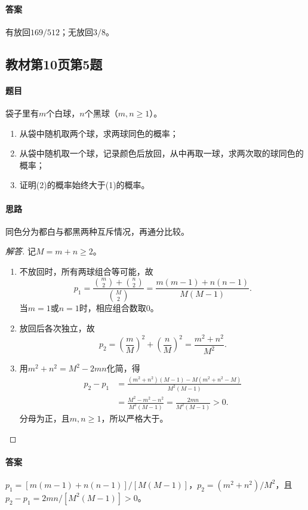 \paragraph{答案}有放回$169/512$；无放回$3/8$。

\subsection{教材第10页第5题}\label{ex:w01-t5}
\paragraph{题目}
袋子里有$m$个白球，$n$个黑球（$m,n\geq1$）。
\begin{enumerate}[label=(\arabic*)]
\item 从袋中随机取两个球，求两球同色的概率；
\item 从袋中随机取一个球，记录颜色后放回，从中再取一球，求两次取的球同色的概率；
\item 证明(2)的概率始终大于(1)的概率。
\end{enumerate}
\paragraph{思路}同色分为都白与都黑两种互斥情况，再通分比较。
\begin{proof}[解答]
记$M=m+n\geq2$。
\begin{enumerate}[label=(\arabic*)]
\item 不放回时，所有两球组合等可能，故
\[p_1=\frac{\binom m2+\binom n2}{\binom M2}=\frac{m(m-1)+n(n-1)}{M(M-1)}.\]
当$m=1$或$n=1$时，相应组合数取0。
\item 放回后各次独立，故
\[p_2=\left(\frac mM\right)^2+\left(\frac nM\right)^2=\frac{m^2+n^2}{M^2}.\]
\item 用$m^2+n^2=M^2-2mn$化简，得
\begin{align*}
p_2-p_1&=\frac{(m^2+n^2)(M-1)-M(m^2+n^2-M)}{M^2(M-1)}\\
&=\frac{M^2-m^2-n^2}{M^2(M-1)}=\frac{2mn}{M^2(M-1)}>0.
\end{align*}
分母为正，且$m,n\geq1$，所以严格大于。
\end{enumerate}
\end{proof}
\paragraph{答案}$p_1=[m(m-1)+n(n-1)]/[M(M-1)]$，$p_2=(m^2+n^2)/M^2$，且$p_2-p_1=2mn/[M^2(M-1)]>0$。

